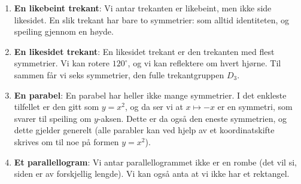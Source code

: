 \documentclass[11pt, norsk]{article}
\begin{document}
\begin{losn}
\begin{enumerate}[a]
\item \textbf{En likebeint trekant}: Vi antar trekanten er likebeint, men ikke side likesidet. En slik trekant har bare to symmetrier: som alltid identiteten, og speiling gjennom en høyde.
\item \textbf{En likesidet trekant}: En likesidet trekant er den trekanten med flest symmetrier. Vi kan rotere $120^\circ$, og vi kan reflektere om hvert hjørne. Til sammen får vi seks symmetrier, den fulle trekantgruppen $D_3$.
\item \textbf{En parabel}: En parabel har heller ikke mange symmetrier. I det enkleste tilfellet er den gitt som $y=x^2$, og da ser vi at $x \mapsto -x$ er en symmetri, som svarer til speiling om $y$-aksen. Dette er da også den eneste symmetrien, og dette gjelder generelt (alle parabler kan ved hjelp av et koordinatskifte skrives om til noe på formen $y=x^2$). 
\item \textbf{Et parallellogram}: Vi antar parallellogrammet ikke er en rombe (det vil si, siden er av forskjellig lengde). Vi kan også anta at vi ikke har et rektangel. 
\end{enumerate}

\end{losn}
\end{document}
